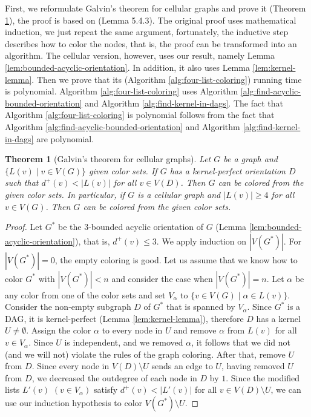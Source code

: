 \documentclass[a4paper, 12pt]{article}
\newtheorem{theo}[lem]{Theorem}
\begin{document}
First, we reformulate Galvin's theorem for cellular graphs and prove it (Theorem \ref{thm:galvin-cellular}), the proof is based on \cite{citeulike:395714} (Lemma 5.4.3). The original proof uses mathematical induction, we just repeat the same argument, fortunately, the inductive step describes how to color the nodes, that is, the proof can be transformed into an algorithm. The cellular version, however, uses our result, namely Lemma \ref{lem:bounded-acyclic-orientation}. In addition, it also uses Lemma \ref{lem:kernel-lemma}. Then we prove that its (Algorithm \ref{alg:four-list-coloring}) running time is polynomial. Algorithm \ref{alg:four-list-coloring} uses Algorithm \ref{alg:find-acyclic-bounded-orientation} and Algorithm \ref{alg:find-kernel-in-dags}. The fact that Algorithm \ref{alg:four-list-coloring} is polynomial follows from the fact that Algorithm \ref{alg:find-acyclic-bounded-orientation} and Algorithm \ref{alg:find-kernel-in-dags} are polynomial.
\begin{theo}[Galvin's theorem for cellular graphs]\label{thm:galvin-cellular} Let $G$ be a graph and $\lbrace L(v) \mid v \in V(G) \rbrace$ given color sets. If $G$ has a kernel-perfect orientation $D$ such that $d^+(v) < |L(v)|$ for all $v \in V(D)$. Then $G$ can be colored from the given color sets.
In particular, if $G$ is a cellular graph and $|L(v)| \geqslant 4$ for all $v \in V(G)$. Then $G$ can be colored from the given color sets.
\end{theo}
\begin{proof}
Let $G^*$ be the $3$-bounded acyclic orientation of $G$ (Lemma \ref{lem:bounded-acyclic-orientation}), that is, $d^+(v) \leqslant 3$. We apply induction on $|V(G^*)|$. For $|V(G^*)|=0$, the empty coloring is good. Let us assume that we know how to color $G^*$ with $|V(G^*)| < n$ and consider the case when $|V(G^*)|=n$. Let $\alpha$ be any color from one of the color sets and set $V_\alpha$ to $\lbrace v \in V(G) \mid \alpha \in L(v) \rbrace$. Consider the non-empty subgraph $D$ of $G^*$ that is spanned by $V_\alpha$. Since $G^*$ is a DAG, it is kernel-perfect (Lemma \ref{lem:kernel-lemma}), therefore $D$ has a kernel $U \neq \emptyset$. Assign the color $\alpha$ to every node in $U$ and remove $\alpha$ from $L(v)$ for all $v \in V_\alpha$. Since $U$ is independent, and we removed $\alpha$, it follows that we did not (and we will not) violate the rules of the graph coloring. After that, remove $U$ from $D$. Since every node in $V(D) \setminus U$ sends an edge to $U$, having removed $U$ from $D$, we decreased the outdegree of each node in $D$ by $1$. Since the modified lists $L'(v)$ $(v \in V_\alpha)$ satisfy $d^+(v) < |L'(v)|$ for all $v \in V(D) \setminus U$, we can use our induction hypothesis to color $V(G^*) \setminus U$.
\end{proof}
\end{document}
